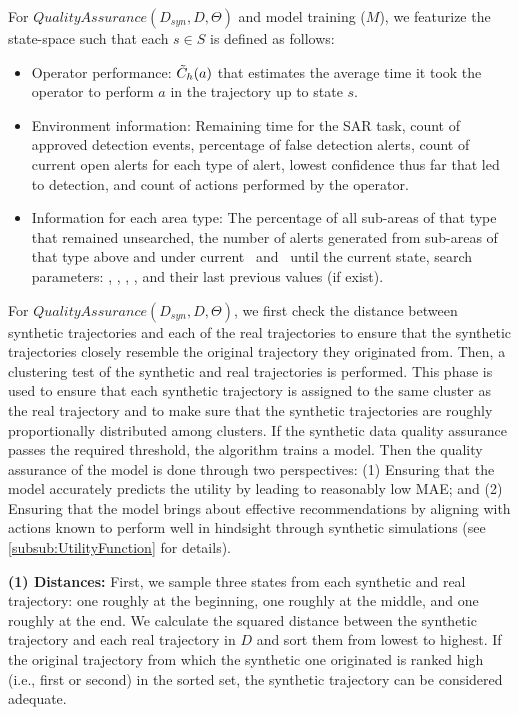 For $QualityAssurance(D_{syn}, D, \Theta)$ and model training ($M$), we featurize the state-space such that each $s\in S$ is defined as follows:
\begin{itemize}[leftmargin=10pt]
\item Operator performance: 
$\Tilde{C}_h(a)$ that estimates the average time it took the operator to perform $a$ in the trajectory up to state $s$.  
\item Environment information: 
Remaining time for the SAR task, count of approved detection events, percentage of false detection alerts, count of current open alerts for each type of alert, lowest confidence thus far that led to detection, and count of actions performed by the operator.
\item Information for each area type:
The percentage of all sub-areas of that type that remained unsearched, the number of alerts generated from sub-areas of that type above and under current \detectiothreshold\ and  \pausetreshold\ until the current state, 
search parameters: \pausetreshold,  \detectiothreshold, \velocity, \altitude, and their last previous values (if exist). 
\end{itemize}



For $QualityAssurance(D_{syn}, D, \Theta)$, we first check the distance between synthetic trajectories and each of the real trajectories to ensure that the synthetic trajectories closely resemble the original trajectory they originated from.
Then, a clustering test of the synthetic and real trajectories is performed. This phase is used to ensure that each synthetic trajectory is assigned to the same cluster as the real trajectory and to make sure that the synthetic trajectories are roughly proportionally distributed among clusters. 
If the synthetic data quality assurance passes the required threshold, the algorithm trains a model. 
Then the quality assurance of the model is done through two perspectives: (1) Ensuring that the model accurately predicts the utility by leading to reasonably low MAE; and (2) Ensuring that the model brings about effective recommendations by aligning with actions known to perform well in hindsight through synthetic simulations (see \ref{subsub:UtilityFunction} for details).

\noindent\textbf{(1) Distances:}
First, we sample three states from each synthetic and real trajectory: one roughly at the beginning, one roughly at the middle, and one roughly at the end. We calculate the squared distance between the synthetic trajectory and each real trajectory in $D$ and sort them from lowest to highest. If the original trajectory from which the synthetic one originated is ranked high (i.e.,  first or second) in the sorted set, the synthetic trajectory can be considered adequate.  


